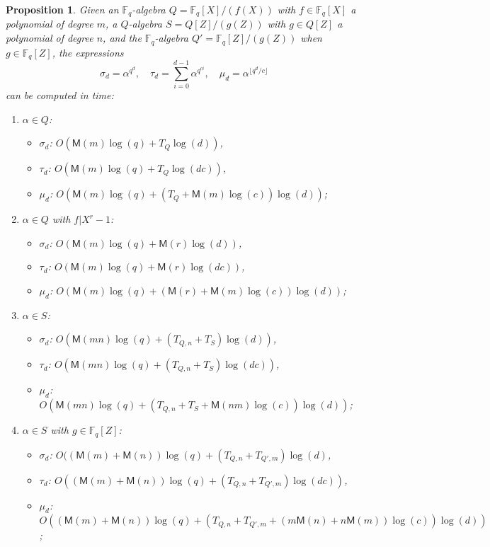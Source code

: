\documentclass[12pt]{article}
\theoremstyle{plain}
\newtheorem{proposition}[theorem]{Proposition}
\theoremstyle{definition}
\def\F{\ensuremath{\mathbb{F}}}
\def\MM{\ensuremath{\mathsf{M}}}
\begin{document}
\begin{proposition}
\label{prop:trace-like}
Given an $\F_q$-algebra $Q = \F_q[X]/(f(X))$
with $f \in \F_q[X]$ a polynomial of degree $m$,
a $Q$-algebra $S =  Q[Z]/(g(Z))$
with $g \in Q[Z]$ a polynomial of degree $n$,
and the $\F_q$-algebra $Q' = \F_q[Z]/(g(Z))$ when $g \in \F_q[Z]$,
the expressions
\[
\sigma_d= \alpha^{q^d}, \quad \tau_d = \sum_{i=0}^{d-1} \alpha^{q^{ci}}, \quad
\mu_d=\alpha^{\lfloor q^d/c\rfloor}
\]
can be computed in time:
\begin{enumerate}[label=\textbf{Case~\theenumi.},leftmargin=*, align=left]
\item $\alpha \in Q$:
\begin{itemize}
\item
$\sigma_d$: $O(\MM(m) \log(q) + T_Q \log(d))$,
\item
$\tau_d$: $O(\MM(m) \log(q) + T_Q \log(d c))$,
\item
$\mu_d$: $O(\MM(m) \log(q) + (T_Q + \MM(m)\log(c))\log(d))$;
\end{itemize}
\item $\alpha \in Q$ with $f | X^r - 1$:
\begin{itemize}
\item
$\sigma_d$: $O(\MM(m) \log(q) + \MM(r) \log(d))$,
\item
$\tau_d$: $O(\MM(m) \log(q) + \MM(r) \log(d c))$,
\item
$\mu_d$: $O(\MM(m) \log(q) + (\MM(r) + \MM(m)\log(c))\log(d))$;
\end{itemize}
\item $\alpha \in S$:
\begin{itemize}
\item
$\sigma_d$: $O(\MM(mn)\log(q) + (T_{Q,n}+T_S)\log(d))$,
\item
$\tau_d$: $O(\MM(mn)\log(q) + (T_{Q,n}+T_S)\log(d c))$,
\item
$\mu_d$: $ O(\MM(mn)\log(q) + (T_{Q,n}+T_S + \MM(nm)\log(c))\log(d))$;
\end{itemize}
\item $\alpha \in S$ with $g \in \F_q[Z]$:
\begin{itemize}
\item
$\sigma_d$: $O((\MM(m)+\MM(n))\log(q) + (T_{Q,n}+T_{Q',m})\log(d)$,
\item
$\tau_d$: $O((\MM(m)+\MM(n))\log(q) + (T_{Q,n}+T_{Q',m})\log(d c))$,
\item
$\mu_d$: $O((\MM(m)+\MM(n))\log(q) + (T_{Q,n}+T_{Q',m} + (m\MM(n)+n\MM(m))\log(c))\log(d))$;
\end{itemize}

\end{enumerate}
\end{proposition}
\end{document}
